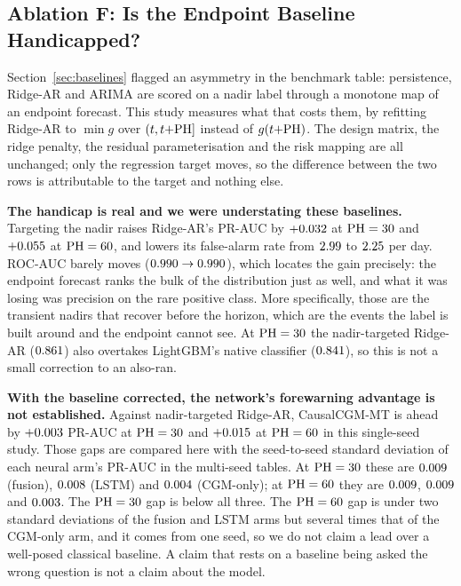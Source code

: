\subsection{Ablation F: Is the Endpoint Baseline Handicapped?}
\label{sec:ablation_f}



Section~\ref{sec:baselines} flagged an asymmetry in the benchmark table:
persistence, Ridge-AR and ARIMA are scored on a nadir label through a monotone
map of an endpoint forecast. This study measures what that costs them, by
refitting Ridge-AR to $\min g$ over $(t, t{+}\mathrm{PH}]$ instead of $g(t{+}\mathrm{PH})$. The
design matrix, the ridge penalty, the residual parameterisation and the risk
mapping are all unchanged; only the regression target moves, so the difference
between the two rows is attributable to the target and nothing else.

\textbf{The handicap is real and we were understating these baselines.}
Targeting the nadir raises Ridge-AR's PR-AUC by $+0.032$ at
$\mathrm{PH} = 30$ and $+0.055$ at $\mathrm{PH} = 60$, and lowers its
false-alarm rate from $2.99$ to
$2.25$ per day. ROC-AUC barely moves
($0.990 \to 0.990$), which
locates the gain precisely: the endpoint forecast ranks the bulk of the
distribution just as well, and what it was losing was precision on the rare
positive class. More specifically, those are the transient nadirs that recover
before the horizon, which are the events the label is built around and the
endpoint cannot see. At
$\mathrm{PH} = 30$ the nadir-targeted Ridge-AR ($0.861$) also
overtakes LightGBM's native classifier ($0.841$), so this is
not a small correction to an also-ran.

\textbf{With the baseline corrected, the network's forewarning advantage is
not established.} Against nadir-targeted Ridge-AR, CausalCGM-MT is ahead by
$+0.003$ PR-AUC at $\mathrm{PH} = 30$ and
$+0.015$ at $\mathrm{PH} = 60$ in this single-seed study. Those
gaps are compared here with the seed-to-seed standard deviation of each neural
arm's PR-AUC in the multi-seed tables. At $\mathrm{PH} = 30$ these are
$0.009$ (fusion), $0.008$ (LSTM) and
$0.004$ (CGM-only); at $\mathrm{PH} = 60$ they are
$0.009$, $0.009$ and
$0.003$. The $\mathrm{PH} = 30$ gap is below all three. The
$\mathrm{PH} = 60$ gap is under two standard deviations of the fusion and LSTM arms
but several times that of the CGM-only arm, and it comes from one seed, so we
do not claim a lead over a well-posed classical baseline. A claim
that rests on a baseline being asked the wrong question is not a claim about the
model.

